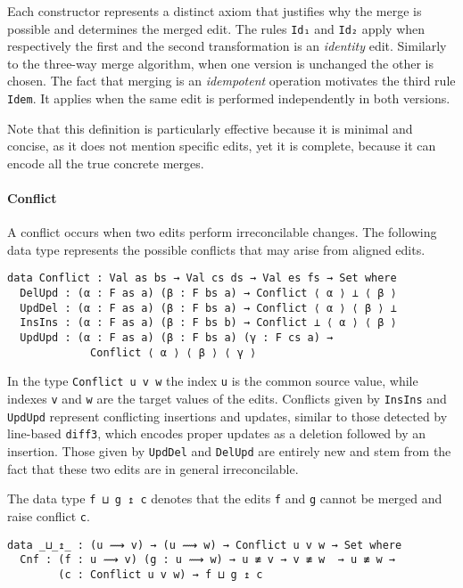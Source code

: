 \documentclass[preprint]{sigplanconf}
\theoremstyle{plain}
\begin{document}
	Each constructor represents a distinct axiom that justifies why
	the merge is possible and determines the merged edit.
	The rules \texttt{Id₁} and \texttt{Id₂} apply when 
	respectively the first and the second transformation is an \emph{identity} 
        edit.
	Similarly to the three-way merge algorithm, when one version is unchanged the other
        is chosen.
	The fact that merging is an \emph{idempotent} operation motivates the 
	third rule \texttt{Idem}.
	It applies when the same edit is performed independently in both versions.
	
	Note that this definition is particularly effective because it is 
	minimal and concise, as it does not mention specific
	edits, yet it is complete, because it can encode all the true concrete 
        merges.	

	\paragraph{Conflict}
	A conflict occurs when two edits perform irreconcilable changes.
	The following data type represents the possible conflicts that may arise
	from aligned edits.
	
\begin{verbatim}
data Conflict : Val as bs → Val cs ds → Val es fs → Set where
  DelUpd : (α : F as a) (β : F bs a) → Conflict ⟨ α ⟩ ⊥ ⟨ β ⟩
  UpdDel : (α : F as a) (β : F bs a) → Conflict ⟨ α ⟩ ⟨ β ⟩ ⊥ 
  InsIns : (α : F as a) (β : F bs b) → Conflict ⊥ ⟨ α ⟩ ⟨ β ⟩
  UpdUpd : (α : F as a) (β : F bs a) (γ : F cs a) →
             Conflict ⟨ α ⟩ ⟨ β ⟩ ⟨ γ ⟩    
\end{verbatim}

	In the type \texttt{Conflict u v w} the index \texttt{u} is
        the common source value, while indexes \texttt{v} and
        \texttt{w} are the target values of the edits.
        Conflicts given by \texttt{InsIns} and \texttt{UpdUpd}
        represent conflicting insertions and updates, similar
        to those detected by line-based \texttt{diff3}, which
        encodes proper updates as a deletion followed by an insertion.
        Those given by \texttt{UpdDel} and \texttt{DelUpd} are
        entirely new and stem from the fact that these two edits are
        in general irreconcilable.

	The data type \texttt{f ⊔ g ↥ c} denotes that the edits
        \texttt{f} and \texttt{g} cannot be merged and raise conflict
        \texttt{c}.

\begin{verbatim}
data _⊔_↥_ : (u ⟿ v) → (u ⟿ w) → Conflict u v w → Set where
  Cnf : (f : u ⟿ v) (g : u ⟿ w) → u ≢ v → v ≢ w  → u ≢ w → 
        (c : Conflict u v w) → f ⊔ g ↥ c
\end{verbatim}
\end{document}
